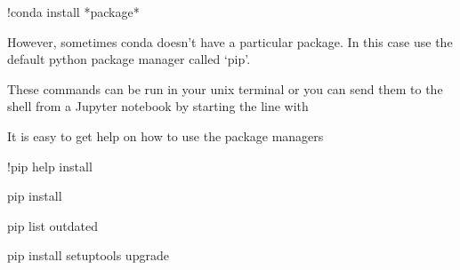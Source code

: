 \documentclass[letterpaper,10pt,english]{sphinxmanual}
\begin{document}
\begin{sphinxVerbatim}[commandchars=\\\{\}]
!conda install *package*
\end{sphinxVerbatim}

However, sometimes conda doesn’t have a particular package.  In this case use the default python package manager called ‘pip’.

These commands can be run in your unix terminal or you can send them to the shell from a Jupyter notebook by starting the line with \sphinxcode{\sphinxupquote{!}}

It is easy to get help on how to use the package managers

\begin{sphinxVerbatim}[commandchars=\\\{\}]
!pip help install
\end{sphinxVerbatim}

\begin{sphinxVerbatim}[commandchars=\\\{\}]
pip  install
\end{sphinxVerbatim}

\begin{sphinxVerbatim}[commandchars=\\\{\}]
pip list \PYGZhy{}\PYGZhy{}outdated
\end{sphinxVerbatim}

\begin{sphinxVerbatim}[commandchars=\\\{\}]
pip install setuptools \PYGZhy{}\PYGZhy{}upgrade
\end{sphinxVerbatim}
\end{document}

